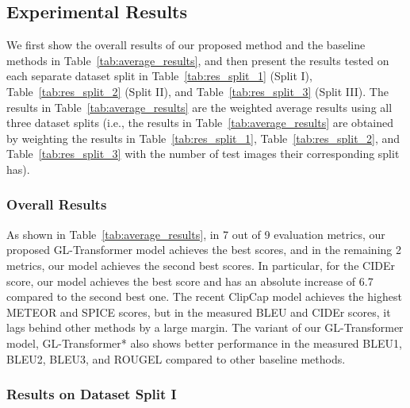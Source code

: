 \documentclass[journal]{IEEEtran}
\begin{document}
\subsection{Experimental Results}




We first show the overall results of our proposed method and the baseline methods in Table~\ref{tab:average_results}, and then present the results tested on each separate dataset split in Table~\ref{tab:res_split_1} (Split I), Table~\ref{tab:res_split_2} (Split II), and Table~\ref{tab:res_split_3} (Split III). The results in Table~\ref{tab:average_results} are the weighted average results using all three dataset splits (i.e., the results in Table~\ref{tab:average_results} are obtained by weighting the results in Table~\ref{tab:res_split_1}, Table~\ref{tab:res_split_2}, and Table~\ref{tab:res_split_3} with the number of test images their corresponding split has).

\subsubsection{Overall Results}

As shown in Table~\ref{tab:average_results}, in 7 out of 9 evaluation metrics, our proposed GL-Transformer model achieves the best scores, and in the remaining 2 metrics, our model achieves the second best scores. In particular, for the CIDEr score, our model achieves the best score and has an absolute increase of 6.7 compared to the second best one. The recent ClipCap model achieves the highest METEOR and SPICE scores, but in the measured BLEU and CIDEr scores, it lags behind other methods by a large margin. The variant of our GL-Transformer model, GL-Transformer* also shows better performance in the measured BLEU1, BLEU2, BLEU3, and ROUGEL compared to other baseline methods. 







\subsubsection{Results on Dataset Split I}
\end{document}
